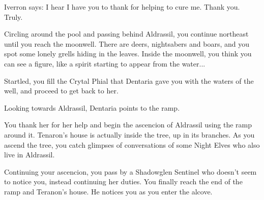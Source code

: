 
Iverron says: I hear I have you to thank for helping to cure me. Thank you. Truly.




Circling around the pool and passing behind Aldrassil, you continue northeast until you reach the moonwell. There are deers, nightsabers and boars, and you spot some lonely grells hiding in the leaves. Inside the moonwell, you think you can see a figure, like a spirit starting to appear from the water...


Startled, you fill the Crytal Phial that Dentaria gave you with the waters of the well, and proceed to get back to her.




Looking towards Aldrassil, Dentaria points to the ramp.


You thank her for her help and begin the ascencion of Aldrassil using the ramp around it. Tenaron's house is actually inside the tree, up in its branches. As you ascend the tree, you catch glimpses of conversations of some Night Elves who also live in Aldrassil.


Continuing your ascencion, you pass by a Shadowglen Sentinel who doesn't seem to notice you, instead continuing her duties. You finally reach the end of the ramp and Teranon's house. He notices you as you enter the alcove.





